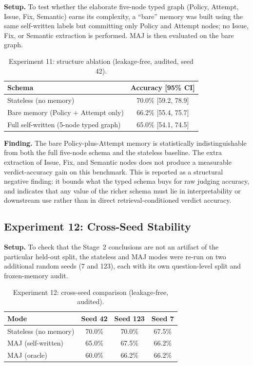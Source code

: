 \documentclass[12pt,a4paper]{report}
\begin{document}
\textbf{Setup.} To test whether the elaborate five-node typed graph (Policy, Attempt, Issue, Fix, Semantic) earns its complexity, a ``bare'' memory was built using the same self-written labels but committing only Policy and Attempt nodes; no Issue, Fix, or Semantic extraction is performed. MAJ is then evaluated on the bare graph.

\begin{table}[h]
\centering
\begin{tabular}{lc}
\toprule
Schema & Accuracy [95\% CI] \\
\midrule
Stateless (no memory) & 70.0\% [59.2, 78.9] \\
Bare memory (Policy + Attempt only) & 66.2\% [55.4, 75.7] \\
Full self-written (5-node typed graph) & 65.0\% [54.1, 74.5] \\
\bottomrule
\end{tabular}
\caption{Experiment 11: structure ablation (leakage-free, audited, seed 42).}
\label{tab:ablation}
\end{table}

\textbf{Finding.} The bare Policy-plus-Attempt memory is statistically indistinguishable from both the full five-node schema and the stateless baseline. The extra extraction of Issue, Fix, and Semantic nodes does not produce a measurable verdict-accuracy gain on this benchmark. This is reported as a structural negative finding: it bounds what the typed schema buys for raw judging accuracy, and indicates that any value of the richer schema must lie in interpretability or downstream use rather than in direct retrieval-conditioned verdict accuracy.

\subsection{Experiment 12: Cross-Seed Stability}

\textbf{Setup.} To check that the Stage~2 conclusions are not an artifact of the particular held-out split, the stateless and MAJ modes were re-run on two additional random seeds (7 and 123), each with its own question-level split and frozen-memory audit.

\begin{table}[h]
\centering
\begin{tabular}{lccc}
\toprule
Mode & Seed 42 & Seed 123 & Seed 7 \\
\midrule
Stateless (no memory) & 70.0\% & 70.0\% & 67.5\% \\
MAJ (self-written) & 65.0\% & 67.5\% & 66.2\% \\
MAJ (oracle) & 60.0\% & 66.2\% & 66.2\% \\
\bottomrule
\end{tabular}
\caption{Experiment 12: cross-seed comparison (leakage-free, audited).}
\label{tab:multiseed}
\end{table}
\end{document}
